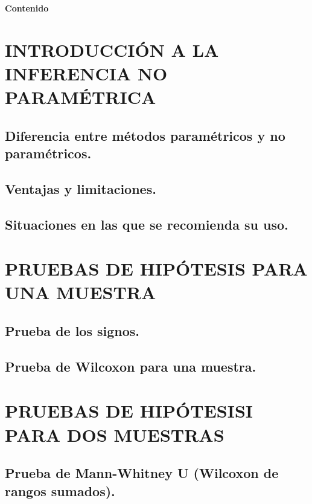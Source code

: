 \documentclass[
  oneside]{book}
\begin{document}
\textbf{Contenido}

\section{INTRODUCCIÓN A LA INFERENCIA NO PARAMÉTRICA}\label{introducciuxf3n-a-la-inferencia-no-paramuxe9trica}

\subsection{Diferencia entre métodos paramétricos y no paramétricos.}\label{diferencia-entre-muxe9todos-paramuxe9tricos-y-no-paramuxe9tricos.}

\subsection{Ventajas y limitaciones.}\label{ventajas-y-limitaciones.}

\subsection{Situaciones en las que se recomienda su uso.}\label{situaciones-en-las-que-se-recomienda-su-uso.}

\section{PRUEBAS DE HIPÓTESIS PARA UNA MUESTRA}\label{pruebas-de-hipuxf3tesis-para-una-muestra}

\subsection{Prueba de los signos.}\label{prueba-de-los-signos.}

\subsection{Prueba de Wilcoxon para una muestra.}\label{prueba-de-wilcoxon-para-una-muestra.}

\section{PRUEBAS DE HIPÓTESISI PARA DOS MUESTRAS}\label{pruebas-de-hipuxf3tesisi-para-dos-muestras}

\subsection{Prueba de Mann-Whitney U (Wilcoxon de rangos sumados).}\label{prueba-de-mann-whitney-u-wilcoxon-de-rangos-sumados.}
\end{document}
